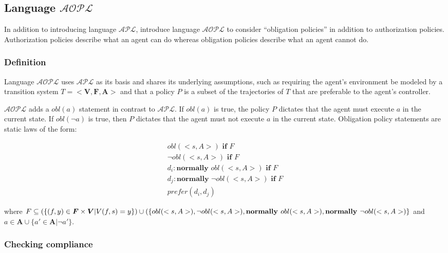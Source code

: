 \subsection{Language $\mathcal{AOPL}$}

In addition to introducing language $\mathcal{APL}$, \citet{gelfond_authorization_2008} introduce language $\mathcal{AOPL}$ to consider ``obligation policies'' in addition to authorization policies.
Authorization policies describe what an agent can do whereas obligation policies describe what an agent cannot do.

\subsubsection{Definition}

Language $\mathcal{AOPL}$ uses $\mathcal{APL}$ as its basis and shares its underlying assumptions, such as requiring the agent's environment be modeled by a transition system $T=<\boldsymbol{V}, \boldsymbol{F}, \boldsymbol{A}>$ and that a policy $P$ is a subset of the trajectories of $T$ that are preferable to the agent's controller.

$\mathcal{AOPL}$ adds a $obl(a)$ statement in contrast to $\mathcal{APL}$.
If $obl(a)$ is true, the policy $P$ dictates that the agent must execute $a$ in the current state.
If $obl(\neg a)$ is true, then $P$ dictates that the agent must not execute $a$ in the current state.
Obligation policy statements are static laws of the form:

\begin{gather*}
    obl\left(<s,A>\right) \textbf{ if } F \\
    \neg obl\left(<s,A>\right) \textbf{ if } F \\
    d_i: \textbf{normally } obl(<s,A>) \textbf{ if } F \\
    d_j: \textbf{normally } \neg obl(<s,A>) \textbf{ if } F \\
    prefer(d_i, d_j)
\end{gather*}

\noindent
where $F\subseteq\left(\{(f, y) \in \boldsymbol{F} \times \boldsymbol{V} | V(f,s)=y\}\right) \cup (\{obl(<s,A>), \\
\neg obl(<s, A>), \\
\textbf{normally } obl(<s,A>), \\
\textbf{normally } \neg obl(<s,A>)\}$ and $a \in \boldsymbol{A} \cup \{a' \in \boldsymbol{A} | \neg a'\}$.

\subsubsection{Checking compliance}

